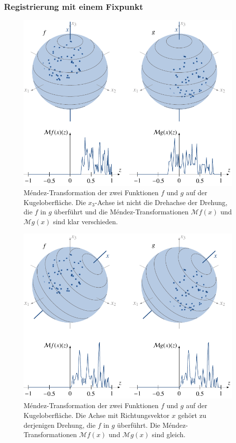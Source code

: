 \subsubsection{Registrierung mit einem Fixpunkt}
\begin{figure}
\centering
\includegraphics{chapters/070-nichtkomm/images/MTransformExamples.pdf}
\caption{Méndez-Transformation der zwei Funktionen $f$ und $g$ auf
der Kugeloberfläche.
Die $x_3$-Achse ist nicht die Drehachse der Drehung, die $f$ in $g$
überführt und die Méndez-Transformationen $\mathcal{M}f(x)$
und $\mathcal{M}g(x)$ sind klar verschieden.
\label{buch:nichtkomm:fig:mtex}}
\end{figure}
\begin{figure}
\centering
\includegraphics{chapters/070-nichtkomm/images/MTransformExamples2.pdf}
\caption{Méndez-Transformation der zwei Funktionen $f$ und $g$ auf
der Kugeloberfläche.
Die Achse mit Richtungsvektor $x$ gehört zu derjenigen Drehung,
die $f$ in $g$ überführt.
Die Méndez-Transformationen $\mathcal{M}f(x)$
und $\mathcal{M}g(x)$ sind gleich.
\label{buch:nichtkomm:fig:mtex2}}
\end{figure}
